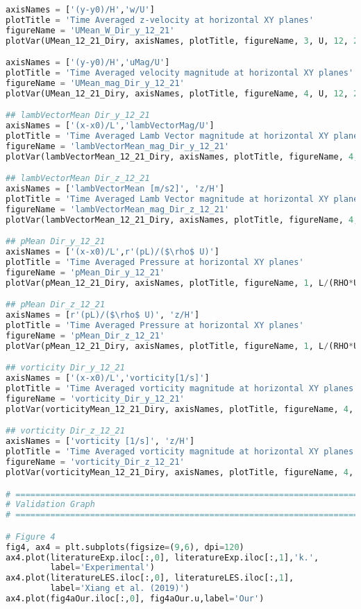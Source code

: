 \documentclass[../main.tex]{subfiles}
\begin{document}
\begin{lstlisting}[language=python]
axisNames = ['(y-y0)/H','w/U']
plotTitle = 'Time Averaged z-velocity at horizontal XY planes'
figureName = 'UMean_W_Dir_y_12_21'
plotVar(UMean_12_21_Diry, axisNames, plotTitle, figureName, 3, U, 12, 21)

axisNames = ['(y-y0)/H','uMag/U']
plotTitle = 'Time Averaged velocity magnitude at horizontal XY planes'
figureName = 'UMean_mag_Dir_y_12_21'
plotVar(UMean_12_21_Diry, axisNames, plotTitle, figureName, 4, U, 12, 21)

## lambVectorMean Dir_y_12_21
axisNames = ['(x-x0)/L','lambVectorMag/U']
plotTitle = 'Time Averaged Lamb Vector magnitude at horizontal XY planes'
figureName = 'lambVectorMean_mag_Dir_y_12_21'
plotVar(lambVectorMean_12_21_Diry, axisNames, plotTitle, figureName, 4, 1, 12, 21)

## lambVectorMean Dir_z_12_21
axisNames = ['lambVectorMean [m/s2]', 'z/H']
plotTitle = 'Time Averaged Lamb Vector magnitude at horizontal XY planes'
figureName = 'lambVectorMean_mag_Dir_z_12_21'
plotVar(lambVectorMean_12_21_Diry, axisNames, plotTitle, figureName, 4, 1, 12, 21)

## pMean Dir_y_12_21
axisNames = ['(x-x0)/L',r'(pL)/($\rho$ U)']
plotTitle = 'Time Averaged Pressure at horizontal XY planes'
figureName = 'pMean_Dir_y_12_21'
plotVar(pMean_12_21_Diry, axisNames, plotTitle, figureName, 1, L/(RHO*U), 12, 21)

## pMean Dir_z_12_21
axisNames = [r'(pL)/($\rho$ U)', 'z/H']
plotTitle = 'Time Averaged Pressure at horizontal XY planes'
figureName = 'pMean_Dir_z_12_21'
plotVar(pMean_12_21_Diry, axisNames, plotTitle, figureName, 1, L/(RHO*U), 12, 21)

## vorticity Dir_y_12_21
axisNames = ['(x-x0)/L','vorticity[1/s]']
plotTitle = 'Time Averaged vorticity magnitude at horizontal XY planes'
figureName = 'vorticity_Dir_y_12_21'
plotVar(vorticityMean_12_21_Diry, axisNames, plotTitle, figureName, 4, 1, 12, 21)

## vorticity Dir_z_12_21
axisNames = ['vorticity [1/s]', 'z/H']
plotTitle = 'Time Averaged vorticity magnitude at horizontal XY planes'
figureName = 'vorticity_Dir_z_12_21'
plotVar(vorticityMean_12_21_Diry, axisNames, plotTitle, figureName, 4, 1, 12, 21)

# =============================================================================
# Validation Graph
# =============================================================================

# Figure 4
fig4, ax4 = plt.subplots(figsize=(9,6), dpi=120)
ax4.plot(literatureExp.iloc[:,0], literatureExp.iloc[:,1],'k.',
         label='Experimental')
ax4.plot(literatureLES.iloc[:,0], literatureLES.iloc[:,1],
         label='Xiang et al. (2019)')
ax4.plot(fig4aOur.iloc[:,0], fig4aOur.u,label='Our')


\end{lstlisting}
\end{document}
